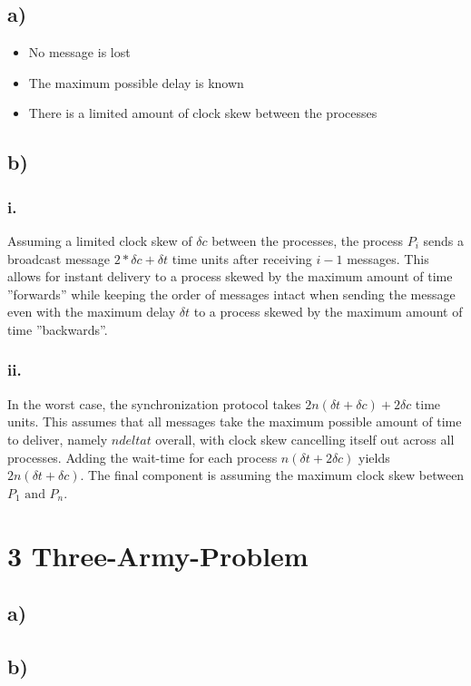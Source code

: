 \documentclass{scrartcl}
\begin{document}
\subsection*{a)}
\begin{itemize}
	\item No message is lost
	\item The maximum possible delay is known
	\item There is a limited amount of clock skew between the processes
\end{itemize}
\subsection*{b)}
\subsubsection*{i.}
Assuming a limited clock skew of \(\delta c\) between the processes, the process \(P_i\) sends a broadcast message \(2 * \delta c + \delta t\) time units after receiving \(i - 1\) messages.
This allows for instant delivery to a process skewed by the maximum amount of time ''forwards'' while keeping the order of messages intact when sending the message even with the maximum delay \(\delta t\) to a process skewed by the maximum amount of time ''backwards''.
\subsubsection*{ii.}
In the worst case, the synchronization protocol takes \(2n (\delta t + \delta c) + 2\delta c\) time units.
This assumes that all messages take the maximum possible amount of time to deliver, namely \(n delta t\) overall, with clock skew cancelling itself out across all processes.
Adding the wait-time for each process \(n(\delta t + 2\delta c)\) yields \(2n (\delta t + \delta c)\).
The final component is assuming the maximum clock skew between \(P_1 \text{ and } P_n\).

\section*{3 Three-Army-Problem}
\subsection*{a)}
\subsection*{b)}
\end{document}
